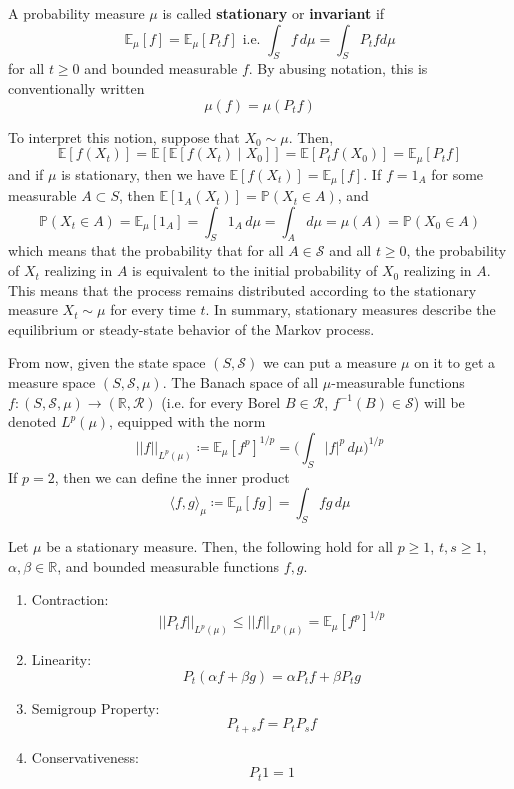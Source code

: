   \begin{definition}
  A probability measure $\mu$ is called \textbf{stationary} or \textbf{invariant} if 
  \[\mathbb{E}_\mu[f] = \mathbb{E}_\mu [P_t f] \text{ i.e. } \int_S f \,d \mu = \int_S P_t f d\mu\]
  for all $t \geq 0$ and bounded measurable $f$. By abusing notation, this is conventionally written 
  \[\mu(f) = \mu(P_t f)\]
  \end{definition}

  To interpret this notion, suppose that $X_0 \sim \mu$. Then, 
  \[\mathbb{E}[f(X_t)] = \mathbb{E}[\mathbb{E}[f(X_t) \mid X_0]] = \mathbb{E}[P_t f (X_0)] = \mathbb{E}_\mu [P_t f]\]
  and if $\mu$ is stationary, then we have $\mathbb{E}[f(X_t)] = \mathbb{E}_\mu [f]$. If $f = 1_A$ for some measurable $A \subset S$, then $\mathbb{E}[1_A (X_t)] = \mathbb{P}(X_t \in A)$, and 
  \[\mathbb{P}(X_t \in A) = \mathbb{E}_\mu [1_A] = \int_S 1_A \,d\mu = \int_A d\mu = \mu(A) = \mathbb{P}(X_0 \in A)\]
  which means that the probability that for all $A \in \mathcal{S}$ and all $t \geq 0$, the probability of $X_t$ realizing in $A$ is equivalent to the initial probability of $X_0$ realizing in $A$. This means that the process remains distributed according to the stationary measure $X_t \sim \mu$ for every time $t$. In summary, stationary measures describe the equilibrium or steady-state behavior of the Markov process.  

  From now, given the state space $(S, \mathcal{S})$ we can put a measure $\mu$ on it to get a measure space $(S, \mathcal{S}, \mu)$. The Banach space of all $\mu$-measurable functions $f: (S, \mathcal{S}, \mu) \rightarrow (\mathbb{R}, \mathcal{R})$ (i.e. for every Borel $B \in \mathcal{R}$, $f^{-1}(B) \in \mathcal{S}$) will be denoted $L^p (\mu)$, equipped with the norm 
  \[||f||_{L^p(\mu)} \coloneqq \mathbb{E}_\mu [f^p]^{1/p} = \bigg( \int_S |f|^p \,d\mu \bigg)^{1/p}\]
  If $p = 2$, then we can define the inner product 
  \[\langle f, g \rangle_\mu \coloneqq \mathbb{E}_\mu [f g] = \int_S f g \, d\mu\]

  \begin{lemma}
  Let $\mu$ be a stationary measure. Then, the following hold for all $p \geq 1$, $t, s \geq 1$, $\alpha, \beta \in \mathbb{R}$, and bounded measurable functions $f, g$. 
  \begin{enumerate}
      \item Contraction: 
      \[||P_t f||_{L^p(\mu)} \leq ||f||_{L^p (\mu)} = \mathbb{E}_\mu [f^p]^{1/p}\]
      
      \item Linearity: 
      \[P_t (\alpha f + \beta g) = \alpha P_t f + \beta P_t g\] 
      
      \item Semigroup Property: 
      \[P_{t + s} f = P_t P_s f\]
      
      \item Conservativeness: 
      \[P_t 1 = 1\]
  \end{enumerate}
  \end{lemma}

